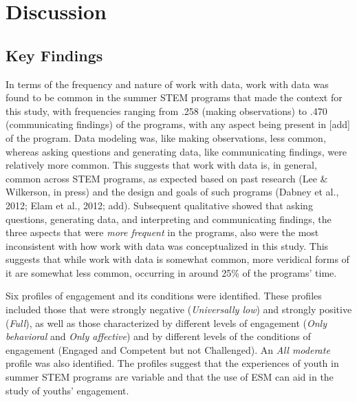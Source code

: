 \documentclass[]{msu-thesis}
\theoremstyle{definition}
\theoremstyle{definition}
\theoremstyle{definition}
\theoremstyle{remark}
\begin{document}
\chapter{Discussion}\label{discussion}

\section{Key Findings}\label{key-findings}

In terms of the frequency and nature of work with data, work with data
was found to be common in the summer STEM programs that made the context
for this study, with frequencies ranging from .258 (making observations)
to .470 (communicating findings) of the programs, with any aspect being
present in {[}add{]} of the program. Data modeling was, like making
observations, less common, whereas asking questions and generating data,
like communicating findings, were relatively more common. This suggests
that work with data is, in general, common across STEM programs, as
expected based on past research (Lee \& Wilkerson, in press) and the
design and goals of such programs (Dabney et al., 2012; Elam et al.,
2012; add). Subsequent qualitative showed that asking questions,
generating data, and interpreting and communicating findings, the three
aspects that were \emph{more frequent} in the programs, also were the
most inconsistent with how work with data was conceptualized in this
study. This suggests that while work with data is somewhat common, more
veridical forms of it are somewhat less common, occurring in around 25\%
of the programs' time.

Six profiles of engagement and its conditions were identified. These
profiles included those that were strongly negative (\emph{Universally
low}) and strongly positive (\emph{Full}), as well as those
characterized by different levels of engagement (\emph{Only behavioral}
and \emph{Only affective}) and by different levels of the conditions of
engagement (Engaged and Competent but not Challenged). An \emph{All
moderate} profile was also identified. The profiles suggest that the
experiences of youth in summer STEM programs are variable and that the
use of ESM can aid in the study of youths' engagement.
\end{document}
